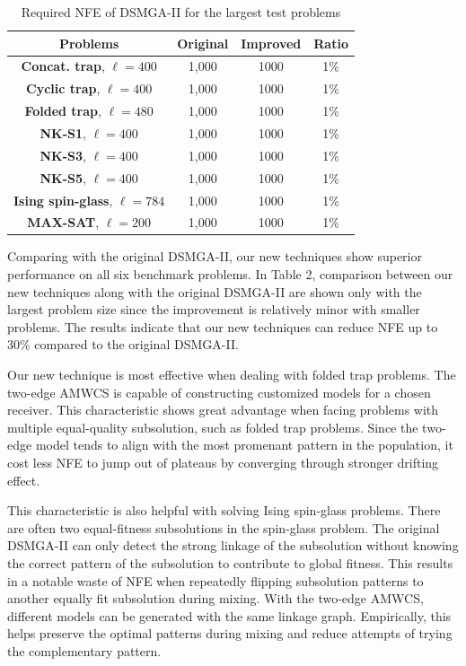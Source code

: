 \documentclass{sig-alternate-05-2015}
\begin{document}
\begin{table}[ht]
\centering
\begin{tabular}{ |c|c|c|c| } \hline
\textbf{Problems}& \textbf{Original} & \textbf{Improved} & \textbf{Ratio}\\ \hline
\textbf{Concat. trap}, $\ell = 400$ 	& 1,000& 1000&1\%\\ \hline
\textbf{Cyclic trap}, $\ell = 400$ 		& 1,000& 1000&1\%\\ \hline
\textbf{Folded trap}, $\ell = 480$	 	& 1,000& 1000&1\%\\ \hline
\textbf{NK-S1}, $\ell = 400$ 				& 1,000& 1000&1\%\\ \hline
\textbf{NK-S3}, $\ell = 400$ 				& 1,000& 1000&1\%\\ \hline
\textbf{NK-S5}, $\ell = 400$ 				& 1,000& 1000&1\%\\ \hline
\textbf{Ising spin-glass}, $\ell = 784$ 	& 1,000& 1000&1\%\\ \hline
\textbf{MAX-SAT}, $\ell = 200$ 			& 1,000& 1000&1\%\\ \hline
\end{tabular}
\caption{Required NFE of DSMGA-II for the largest test problems}
\end{table}

Comparing with the original DSMGA-II, our new techniques show superior performance on all six benchmark problems.
In Table 2, comparison between our new techniques along with the original DSMGA-II are shown only with the largest problem size since the improvement is relatively minor with smaller problems. 
The results indicate that our new techniques can reduce NFE up to 30\% compared to the original DSMGA-II. 


Our new technique is most effective when dealing with folded trap problems.
The two-edge AMWCS is capable of constructing customized models for a chosen receiver. 
This characteristic shows great advantage when facing problems with multiple equal-quality subsolution, such as folded trap problems.
Since the two-edge model tends to align with the most promenant pattern in the population, it cost less NFE to jump out of plateaus by converging through stronger drifting effect.


This characteristic is also helpful with solving Ising spin-glass problems. 
There are often two equal-fitness subsolutions in the spin-glass problem.
The original DSMGA-II can only detect the strong linkage of the subsolution without knowing the correct pattern of the subsolution to contribute to global fitness.
This results in a notable waste of NFE when repeatedly flipping subsolution patterns to another equally fit subsolution during mixing.
With the two-edge AMWCS, different models can be generated with the same linkage graph. 
Empirically, this helps preserve the optimal patterns during mixing and reduce attempts of trying the complementary pattern.
\end{document}
